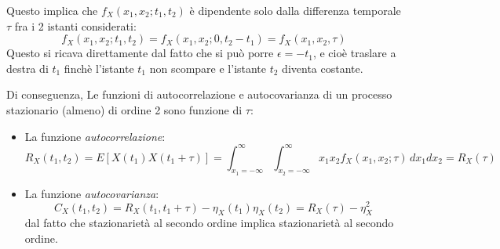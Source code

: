 \documentclass[a4paper,11pt]{article}
\begin{document}
Questo implica che $f_X(x_1, x_2; t_1, t_2)$ è dipendente solo dalla differenza temporale $\tau$ fra i 2 istanti considerati:
$$
f_X(x_1, x_2; t_1, t_2) = f_X(x_1, x_2; 0, t_2 - t_1) = f_X(x_1, x_2, \tau)
$$
Questo si ricava direttamente dal fatto che si può porre $\epsilon = -t_1$, e cioè traslare a destra di $t_1$ finchè l'istante $t_1$ non scompare e l'istante $t_2$ diventa costante.

Di conseguenza, Le funzioni di autocorrelazione e autocovarianza di un processo stazionario (almeno) di ordine 2 sono funzione di $\tau$:
\begin{itemize}
\item La funzione \textit{autocorrelazione}:
$$
R_X(t_1, t_2) = E\left[ X(t_1) X(t_1 + \tau) \right] = \int_{x_1 = -\infty}^{\infty} \int_{x_2 = -\infty}^{\infty} x_1 x_2 f_X(x_1, x_2; \tau) \, dx_1 dx_2 = R_X(\tau)
$$
\item La funzione \textit{autocovarianza}:
$$
C_X(t_1, t_2) = R_X(t_1, t_1 + \tau) - \eta_X(t_1) \eta_X(t_2) = R_X(\tau) - \eta_X^2
$$
dal fatto che stazionarietà al secondo ordine implica stazionarietà al secondo ordine.
\end{itemize}
\end{document}
